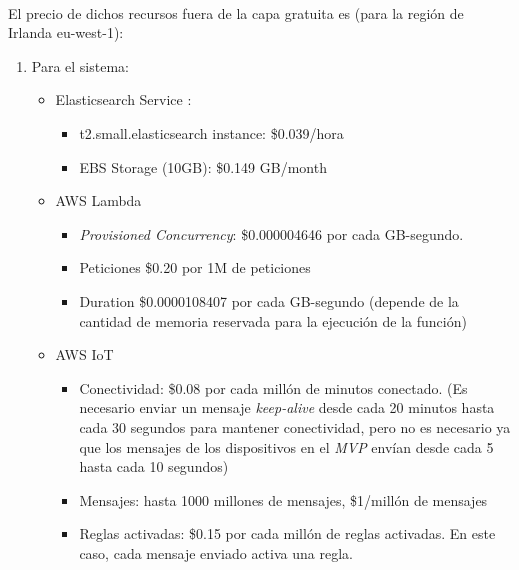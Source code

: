 \documentclass[../../memoria.tex]{subfiles}
\begin{document}
\paragraph{}
El precio de dichos recursos fuera de la capa gratuita es (para la región de Irlanda eu-west-1):

\begin{enumerate}

    \item Para el sistema:

          \begin{itemize}
              \item Elasticsearch Service \cite{awselasticpricing}:
                    \begin{itemize}
                        \item t2.small.elasticsearch instance: \$0.039/hora
                        \item EBS Storage (10GB): \$0.149 GB/month
                    \end{itemize}

              \item AWS Lambda \cite{awslambdapricing}
                    \begin{itemize}
                        \item \textit{Provisioned Concurrency}: \$0.000004646 por cada GB-segundo.
                        \item Peticiones \$0.20 por 1M de peticiones
                        \item Duration \$0.0000108407 por cada GB-segundo (depende de la cantidad de memoria reservada para la ejecución de la función)
                    \end{itemize}
              \item AWS IoT \cite{awsiotpricing}
                    \begin{itemize}
                        \item Conectividad: \$0.08 por cada millón de minutos conectado. (Es necesario enviar un mensaje \textit{keep-alive} desde cada 20 minutos hasta cada 30 segundos para mantener conectividad, pero no es necesario ya que los mensajes de los dispositivos en el \textit{MVP} envían desde cada 5 hasta cada 10 segundos)
                        \item Mensajes: hasta 1000 millones de mensajes, \$1/millón de mensajes
                        \item Reglas activadas: \$0.15 por cada millón de reglas activadas. En este caso, cada mensaje enviado activa una regla.
                    \end{itemize}
          \end{itemize}


\end{enumerate}
\end{document}
